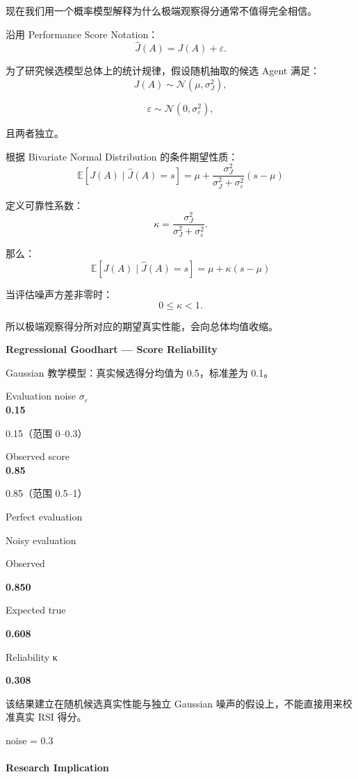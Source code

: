 现在我们用一个概率模型解释为什么极端观察得分通常不值得完全相信。

沿用 Performance Score Notation：
\[\widehat J(A)=J(A)+\varepsilon.\]

为了研究候选模型总体上的统计规律，假设随机抽取的候选 Agent 满足：
\[J(A)\sim\mathcal N(\mu,\sigma_J^2),\]

\[\varepsilon\sim\mathcal N(0,\sigma_\varepsilon^2),\]

且两者独立。

根据 Bivariate Normal Distribution 的条件期望性质：
\[\boxed{
\mathbb E[J(A)\mid\widehat J(A)=s]
=
\mu+
\frac{\sigma_J^2}
{\sigma_J^2+\sigma_\varepsilon^2}
(s-\mu)
}\]

定义可靠性系数：
\[\kappa=
\frac{\sigma_J^2}
{\sigma_J^2+\sigma_\varepsilon^2}.\]

那么：
\[\boxed{
\mathbb E[J(A)\mid\widehat J(A)=s]
=
\mu+\kappa(s-\mu)
}\]

当评估噪声方差非零时：
\[0\leq\kappa<1.\]

所以极端观察得分所对应的期望真实性能，会向总体均值收缩。

\textbf{Regressional Goodhart --- Score Reliability}

Gaussian 教学模型：真实候选得分均值为 0.5，标准差为 0.1。

Evaluation noise \(\sigma_\varepsilon\)\\
\textbf{0.15}

0.15（范围 0--0.3）

Observed score\\
\textbf{0.85}

0.85（范围 0.5--1）


Perfect evaluation

Noisy evaluation

Observed

\textbf{0.850}

Expected true

\textbf{0.608}

Reliability κ

\textbf{0.308}

该结果建立在随机候选真实性能与独立 Gaussian 噪声的假设上，不能直接用来校准真实 RSI 得分。

noise = 0.3


\hypertarget{part-3-40-0001-research-implication}{%
\paragraph{Research Implication}\label{part-3-40-0001-research-implication}}

